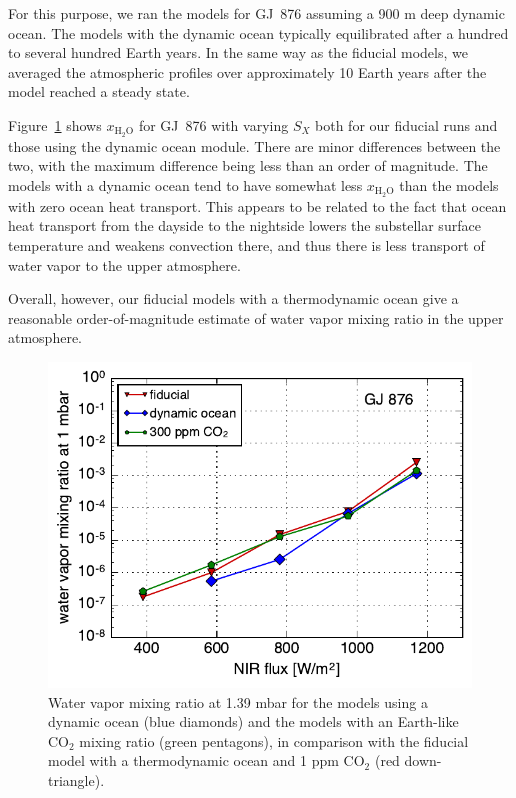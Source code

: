 \documentclass[11pt,numberedappendix,twocolappendix,]{emulateapj}
\def\water{H$_2$O}
\def\xwater{$x_\text{\water}$}
\def\wv{water vapor}
\begin{document}
For this purpose, we ran the models for GJ~876 assuming a 900 m deep dynamic ocean. 
The models with the dynamic ocean typically equilibrated after a hundred to several hundred Earth years. 
In the same way as the fiducial models, we averaged the atmospheric profiles  over approximately 10 Earth years after the model reached a steady state. 

Figure~\ref{fig:change_ocean} shows \xwater{} for GJ~876 with varying $S_X$ both for our fiducial runs and those using the dynamic ocean module.  
There are minor differences between the two, with the maximum difference being less than an order of magnitude. 
The models with a dynamic ocean tend to have somewhat less \xwater{} than the models with zero ocean heat transport. 
This appears to be related to the fact that ocean heat transport from the dayside to the nightside lowers the substellar surface temperature and weakens convection there, and thus there is less transport of water vapor to the upper atmosphere. 

Overall, however, our fiducial models with a thermodynamic ocean give a reasonable order-of-magnitude estimate of \wv{} mixing ratio in the upper atmosphere. 

\begin{figure}[!h]
    \begin{center}
    \includegraphics[width=0.9\hsize]{xH2O_sensitivity.pdf}
    \end{center}
\caption{Water vapor mixing ratio at 1.39 mbar for the models using a dynamic ocean (blue diamonds) and the models with an Earth-like CO$_2$ mixing ratio (green pentagons), in comparison with the fiducial model with a thermodynamic ocean and 1 ppm CO$_2$ (red down-triangle). }
\label{fig:change_ocean}
\end{figure}
\end{document}
